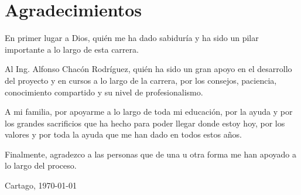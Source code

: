 \chapter*{Agradecimientos}
\thispagestyle{empty}

En primer lugar a Dios, quién me ha dado sabiduría y ha sido un pilar importante a lo largo de esta carrera. 

Al Ing. Alfonso Chacón Rodríguez, quién ha sido un gran apoyo en el desarrollo del proyecto y en cursos a lo largo de la carrera, por los consejos, paciencia, conocimiento compartido y su nivel de profesionalismo. 


A mi familia, por apoyarme a lo largo de toda mi educación, por la ayuda y por los grandes sacrificios que ha hecho para poder llegar donde estoy hoy, por los valores y por toda la ayuda que me han dado en todos estos años.


Finalmente, agradezco a las personas que de una u otra forma me han apoyado a lo largo del proceso.
\vspace*{1cm}

\scriptAuthor

Cartago, \today

\cleardoublepage

